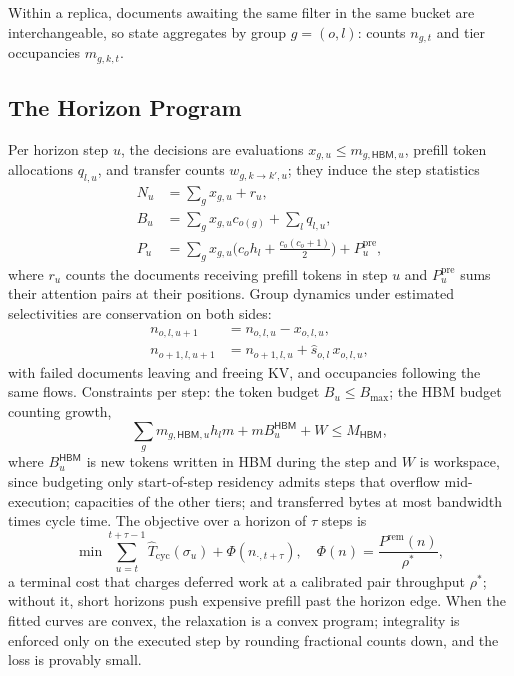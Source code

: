 \documentclass[10pt,twocolumn]{article}
\newcommand{\hbm}{\mathsf{HBM}}
\newcommand{\Bmax}{B_{\max}}
\newcommand{\shat}{\hat{s}}
\begin{document}
Within a replica, documents awaiting the same filter in the same bucket are interchangeable, so state aggregates by group $g = (o,l)$: counts $n_{g,t}$ and tier occupancies $m_{g,k,t}$.

\subsection{The Horizon Program}

Per horizon step $u$, the decisions are evaluations $x_{g,u} \le m_{g,\hbm,u}$, prefill token allocations $q_{l,u}$, and transfer counts $w_{g,k \to k',u}$; they induce the step statistics
\begin{align}
N_u &= \textstyle\sum_g x_{g,u} + r_u, \nonumber\\
B_u &= \textstyle\sum_g x_{g,u} c_{o(g)} + \textstyle\sum_l q_{l,u}, \label{eq:induced}\\
P_u &= \textstyle\sum_g x_{g,u}\big( c_o h_l + \tfrac{c_o(c_o+1)}{2}\big) + P^{\mathrm{pre}}_u, \nonumber
\end{align}
where $r_u$ counts the documents receiving prefill tokens in step $u$ and $P^{\mathrm{pre}}_u$ sums their attention pairs at their positions.
Group dynamics under estimated selectivities are conservation on both sides:
\begin{align}
n_{o,l,u+1} &= n_{o,l,u} - x_{o,l,u}, \label{eq:dyn}\\
n_{o+1,l,u+1} &= n_{o+1,l,u} + \shat_{o,l}\, x_{o,l,u}, \nonumber
\end{align}
with failed documents leaving and freeing KV, and occupancies following the same flows. Constraints per step: the token budget $B_u \le \Bmax$; the HBM budget counting growth,
\begin{equation}
\label{eq:hbm}
\textstyle\sum_g m_{g,\hbm,u} h_l m + m B^{\hbm}_u + W \le M_{\hbm},
\end{equation}
where $B^{\hbm}_u$ is new tokens written in HBM during the step and $W$ is workspace, since budgeting only start-of-step residency admits steps that overflow mid-execution; capacities of the other tiers; and transferred bytes at most bandwidth times cycle time. The objective over a horizon of $\tau$ steps is
\begin{equation}
\label{eq:objective}
\min \sum_{u=t}^{t+\tau-1} \widehat{T}_{\mathrm{cyc}}(\sigma_u) + \Phi(n_{\cdot,t+\tau}),
\quad \Phi(n) = \frac{P^{\mathrm{rem}}(n)}{\rho^{\ast}},
\end{equation}
a terminal cost that charges deferred work at a calibrated pair throughput $\rho^{\ast}$; without it, short horizons push expensive prefill past the horizon edge. When the fitted curves are convex, the relaxation is a convex program; integrality is enforced only on the executed step by rounding fractional counts down, and the loss is provably small.
\end{document}
